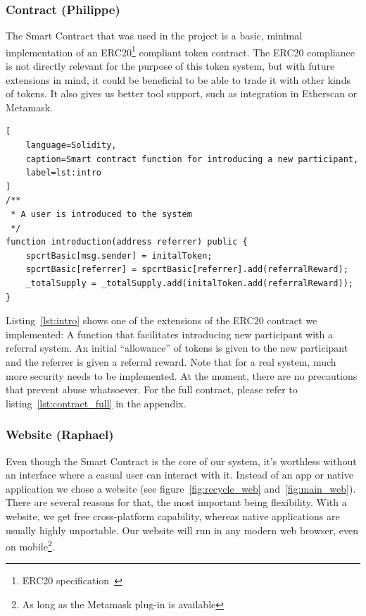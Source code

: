 \documentclass[11pt]{scrartcl}
\begin{document}
\subsubsection{Contract (Philippe)}
The Smart Contract that was used in the project is a basic, minimal implementation of an ERC20\footnote{ERC20 specification~\cite{vogelsteller20erc}} compliant token contract. The ERC20 compliance is not directly relevant for the purpose of this token system, but with future extensions in mind, it could be beneficial to be able to trade it with other kinds of tokens. It also gives us better tool support, such as integration in Etherscan or Metamask.\\
%
\begin{lstlisting}[
    language=Solidity,
    caption=Smart contract function for introducing a new participant,
    label=lst:intro
]
/**
 * A user is introduced to the system
 */
function introduction(address referrer) public {
    spcrtBasic[msg.sender] = initalToken;
	spcrtBasic[referrer] = spcrtBasic[referrer].add(referralReward);
	_totalSupply = _totalSupply.add(initalToken.add(referralReward));
}
\end{lstlisting}
%
Listing~\ref{lst:intro} shows one of the extensions of the ERC20 contract we implemented: A function that facilitates introducing new participant with a referral system. An initial ``allowance'' of tokens is given to the new participant and the referrer is given a referral reward. Note that for a real system, much more security needs to be implemented. At the moment, there are no precautions that prevent abuse whatsoever. For the full contract, please refer to listing~\ref{lst:contract_full} in the appendix.

\subsubsection{Website (Raphael)}

Even though the Smart Contract is the core of our system, it's worthless without an interface where a casual user can interact with it. Instead of an app or native application we chose a website (see figure~\ref{fig:recycle_web} and~\ref{fig:main_web}). There are several reasons for that, the most important being flexibility. With a website, we get free cross-platform capability, whereas native applications are usually highly unportable. Our website will run in any modern web browser, even on mobile\footnote{As long as the Metamask plug-in is available}.
\end{document}
